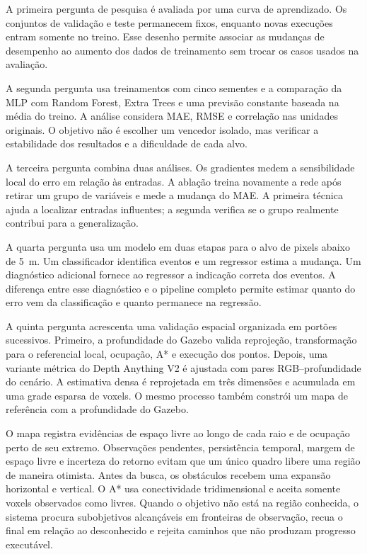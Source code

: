 A primeira pergunta de pesquisa é avaliada por uma curva de aprendizado. Os conjuntos de validação e teste permanecem fixos, enquanto novas execuções entram somente no treino. Esse desenho permite associar as mudanças de desempenho ao aumento dos dados de treinamento sem trocar os casos usados na avaliação.

A segunda pergunta usa treinamentos com cinco sementes e a comparação da MLP com Random Forest, Extra Trees e uma previsão constante baseada na média do treino. A análise considera MAE, RMSE e correlação nas unidades originais. O objetivo não é escolher um vencedor isolado, mas verificar a estabilidade dos resultados e a dificuldade de cada alvo.

A terceira pergunta combina duas análises. Os gradientes medem a sensibilidade local do erro em relação às entradas. A ablação treina novamente a rede após retirar um grupo de variáveis e mede a mudança do MAE. A primeira técnica ajuda a localizar entradas influentes; a segunda verifica se o grupo realmente contribui para a generalização.

A quarta pergunta usa um modelo em duas etapas para o alvo de pixels abaixo de 5~m. Um classificador identifica eventos e um regressor estima a mudança. Um diagnóstico adicional fornece ao regressor a indicação correta dos eventos. A diferença entre esse diagnóstico e o pipeline completo permite estimar quanto do erro vem da classificação e quanto permanece na regressão.

A quinta pergunta acrescenta uma validação espacial organizada em portões sucessivos. Primeiro, a profundidade do Gazebo valida reprojeção, transformação para o referencial local, ocupação, A* e execução dos pontos. Depois, uma variante métrica do Depth Anything V2 é ajustada com pares RGB--profundidade do cenário. A estimativa densa é reprojetada em três dimensões e acumulada em uma grade esparsa de voxels. O mesmo processo também constrói um mapa de referência com a profundidade do Gazebo.

O mapa registra evidências de espaço livre ao longo de cada raio e de ocupação perto de seu extremo. Observações pendentes, persistência temporal, margem de espaço livre e incerteza do retorno evitam que um único quadro libere uma região de maneira otimista. Antes da busca, os obstáculos recebem uma expansão horizontal e vertical. O A* usa conectividade tridimensional e aceita somente voxels observados como livres. Quando o objetivo não está na região conhecida, o sistema procura subobjetivos alcançáveis em fronteiras de observação, recua o final em relação ao desconhecido e rejeita caminhos que não produzam progresso executável.

